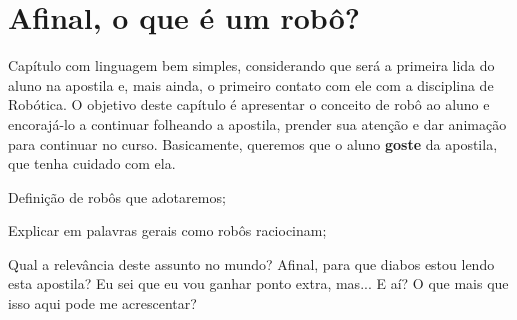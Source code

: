 \chapter{Afinal, o que é um robô?}

Capítulo com linguagem bem simples, considerando que será a primeira lida do aluno na apostila e, mais ainda, o primeiro contato com ele com a disciplina de Robótica. O objetivo deste capítulo é apresentar o conceito de robô ao aluno e encorajá-lo a continuar folheando a apostila, prender sua atenção e dar animação para continuar no curso. Basicamente, queremos que o aluno \textbf{goste} da apostila, que tenha cuidado com ela.

Definição de robôs que adotaremos;

Explicar em palavras gerais como robôs raciocinam;

Qual a relevância deste assunto no mundo? Afinal, para que diabos estou lendo esta apostila? Eu sei que eu vou ganhar ponto extra, mas... E aí? O que mais que isso aqui pode me acrescentar?